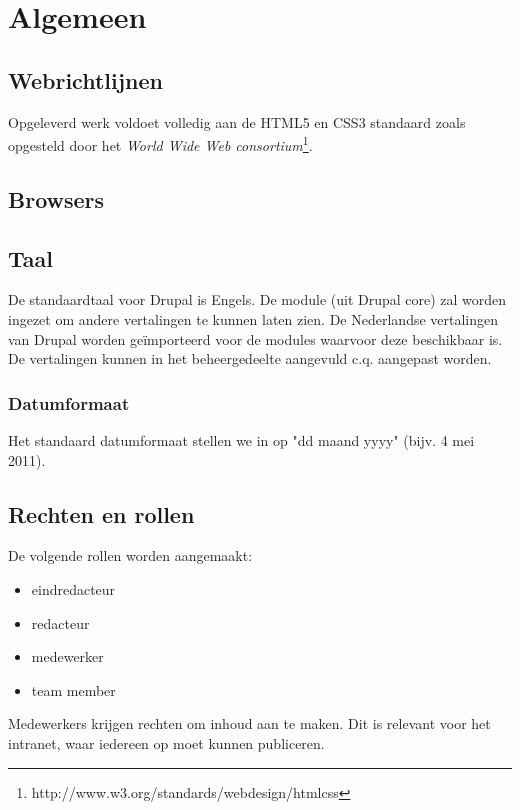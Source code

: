 \section{Algemeen}\label{algemeen}

\subsection{Webrichtlijnen}

Opgeleverd werk voldoet volledig aan de HTML5 en CSS3 standaard zoals opgesteld door het \emph{World Wide Web consortium}\footnote{http://www.w3.org/standards/webdesign/htmlcss}.

\subsection{Browsers}


\subsection{Taal}\label{taal}
De standaardtaal voor Drupal is Engels. De  module (uit Drupal core) zal worden ingezet om andere vertalingen te kunnen laten zien. De Nederlandse vertalingen van Drupal worden ge\"{i}mporteerd voor de modules waarvoor deze beschikbaar is. De vertalingen kunnen in het beheergedeelte aangevuld c.q. aangepast worden.

\subsubsection{Datumformaat}
Het standaard datumformaat stellen we in op "dd maand yyyy" (bijv. 4 mei 2011).

\subsection{Rechten en rollen}\label{rollen}

De volgende rollen worden aangemaakt:
\begin{itemize}
\item eindredacteur
\item redacteur
\item medewerker
\item team member
\end{itemize}
Medewerkers krijgen rechten om inhoud aan te maken. Dit is relevant voor het intranet, waar iedereen op moet kunnen publiceren.

